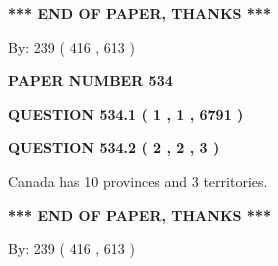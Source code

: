 \documentclass[12pt]{article}
\begin{document}
   
   
   
   
\vspace{1.0in} 
{\textbf{\large{ *** END OF PAPER, THANKS *** }}} 
   
   
\hspace{1.0in} By: 
 239 ( 416 ,  613 )
   
   
   
   
\newpage 
\setcounter{page}{ 
   534001 } 
   
   
   
   
 {\textbf{ \Large{ PAPER NUMBER  534  }}}
   
   
\vspace{0.2in}
   
   
   
   
   
   
 \vspace{0.2in}
 
 
 
 
   
   
  
\vspace{0.2in}
  
{\textbf{\Large{QUESTION
534.1 
 ( 1 , 1 , 6791 )
}}}
  
  
  
\vspace{0.2in}
  
{\textbf{\Large{QUESTION
534.2 
 ( 2 , 2 , 3 )
}}}
  
  
 
 
\noindent{}
 
 
Canada has 10  provinces and 3 territories.
 
 
 
 
   
   
 \vspace{0.2in}
 
   
   
   
   
\vspace{1.0in} 
{\textbf{\large{ *** END OF PAPER, THANKS *** }}} 
   
   
\hspace{1.0in} By: 
 239 ( 416 ,  613 )
   
   
   
   
\newpage 
\setcounter{page}{ 
   535001 } 
   
\end{document}
